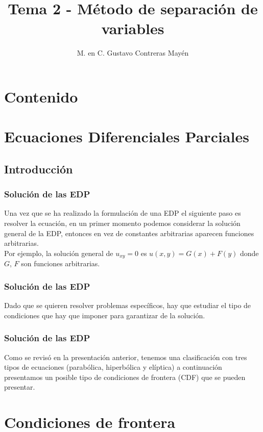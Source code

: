 \documentclass[12pt]{beamer}
\title{Tema 2 - Método de separación de variables}
\author{M. en C. Gustavo Contreras Mayén}
\date{}
\begin{document}
\maketitle
\fontsize{14}{14}\selectfont
{}

\section*{Contenido}

\section{Ecuaciones Diferenciales Parciales}
\subsection{Introducción}

\begin{frame}
\frametitle{Solución de las EDP}
Una vez que se ha realizado la formulación de una EDP el siguiente paso es resolver la ecuación, en un primer momento podemos considerar la solución general de la EDP, entonces en vez de constantes arbitrarias aparecen funciones arbitrarias.
\\
\bigskip
\pause
Por ejemplo, la solución general de $u_{xy} = 0$ es $u(x, y) = G(x) + F (y)$ donde $G$, $F$ son funciones arbitrarias.
\end{frame}
\begin{frame}
\frametitle{Solución de las EDP}
Dado que se quieren resolver problemas específicos, hay que estudiar el tipo de condiciones que hay que imponer para garantizar  de la solución.
\end{frame}
\begin{frame}
\frametitle{Solución de las EDP}
Como se revisó en la presentación anterior, tenemos una clasificación con tres tipos de ecuaciones (parabólica, hiperbólica y elíptica) a continuación presentamos un posible tipo de condiciones de frontera (CDF) que se pueden presentar.
\end{frame}

\section{Condiciones de frontera}
\end{document}

